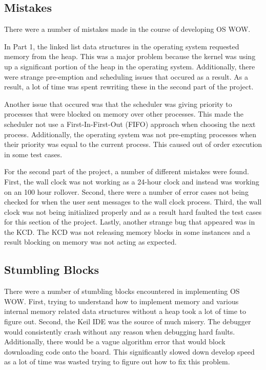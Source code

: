 \documentclass[se]{uw-wkrpt}
\begin{document}
\subsection{Mistakes}

There were a number of mistakes made in the course of developing OS WOW.

In Part 1, the linked list data structures in the operating system requested memory from the heap. This was a major problem because the kernel was using up a significant portion of the heap in the operating system. Additionally, there were strange pre-emption and scheduling issues that occured as a result. As a result, a lot of time was spent rewriting these in the second part of the project.

Another issue that occured was that the scheduler was giving priority to processes that were blocked on memory over other processes. This made the scheduler not use a First-In-First-Out (FIFO) approach when choosing the next process. Additionally, the operating system was not pre-empting processes when their priority was equal to the current process. This caused out of order execution in some test cases.

For the second part of the project, a number of different mistakes were found. First, the wall clock was not working as a 24-hour clock and instead was working on an 100 hour rollover. Second, there were a number of error cases not being checked for when the user sent messages to the wall clock process. Third, the wall clock was not being initialized properly and as a result hard faulted the test cases for this section of the project. Lastly, another strange bug that appeared was in the KCD. The KCD was not releasing memory blocks in some instances and a result blocking on memory was not acting as expected.

\subsection{Stumbling Blocks}

There were a number of stumbling blocks encountered in implementing OS WOW. First, trying to understand how to implement memory and various internal memory related data structures without a heap took a lot of time to figure out. Second, the Keil IDE was the source of much misery. The debugger would consistently crash without any reason when debugging hard faults. Additionally, there would be a vague algorithm error that would block downloading code onto the board. This significantly slowed down develop speed as a lot of time was wasted trying to figure out how to fix this problem. 
\end{document}
